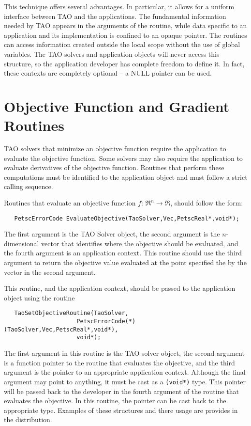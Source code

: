 This technique offers several advantages.
In particular, it allows for a uniform interface between TAO and 
the applications.   The fundamental information needed by TAO 
appears in the arguments of the routine, while data specific to an application
and its implementation is confined to an opaque pointer.
The routines can access information created outside the 
local scope without the use of global variables.
The TAO solvers and application objects will never access this structure, 
so the application developer has complete freedom to define it.  In fact,
these contexts are completely optional -- a NULL pointer can be used.



\section{Objective Function and Gradient Routines}\label{sec:fghj}

TAO solvers that minimize an objective function require
the application to evaluate the objective function.  Some solvers
may also require the application to evaluate
derivatives of the objective function.  
Routines that perform these computations must be identified
to the application object and must follow a strict calling sequence.

Routines that evaluate an objective function $f: \, \Re^n \to \Re$,
should follow the form:
\begin{verbatim}
   PetscErrorCode EvaluateObjective(TaoSolver,Vec,PetscReal*,void*);
\end{verbatim}
\noindent
The first argument is the TAO Solver object, the second argument is the
$n$-dimensional vector that identifies where the objective should be evaluated, 
and the fourth argument is an application context.
This routine should use the third argument to return the objective value 
evaluated at the point
specified the by the vector in the second argument.

This routine, and the application context, should be passed to the 
application object using
the routine 
\begin{verbatim}
   TaoSetObjectiveRoutine(TaoSolver,
                     PetscErrorCode(*)(TaoSolver,Vec,PetscReal*,void*),
                     void*);
\end{verbatim}
\noindent
The first argument in this routine is the TAO solver object, 
the second argument is a function pointer to the routine that 
evaluates the objective, and the third
argument is the pointer to an appropriate application context.  
Although the final argument may point to anything, it must be cast as a {\tt (void*)} type.
This pointer will be passed back to the developer in the fourth argument of the
routine that evaluates the objective.  In this routine, the pointer can be cast
back to the appropriate type.  Examples of these structures and there usage
are provides in the distribution.

